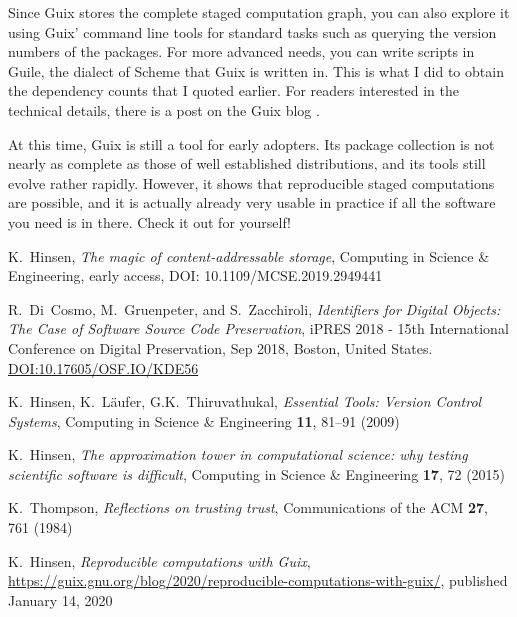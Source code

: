 \documentclass[10pt,journal,compsoc]{IEEEtran}
\begin{document}
Since Guix stores the complete staged computation graph, you can also explore it using Guix' command line tools for standard tasks such as querying the version numbers of the packages. For more advanced needs, you can write scripts in Guile, the dialect of Scheme that Guix is written in. This is what I did to obtain the dependency counts that I quoted earlier. For readers interested in the technical details, there is a post on the Guix blog \cite{guix-blog}.

At this time, Guix is still a tool for early adopters. Its package collection is not nearly as complete as those of well established distributions, and its tools still evolve rather rapidly. However, it shows that reproducible staged computations are possible, and it is actually already very usable in practice if all the software you need is in there. Check it out for yourself!


%
%
%

\begin{thebibliography}{1}

K.~Hinsen,
\textit{The magic of content-addressable storage},
Computing in Science \& Engineering, early access,
DOI: 10.1109/MCSE.2019.2949441

R.~Di~Cosmo, M.~Gruenpeter, and S.~Zacchiroli,
\textit{Identifiers for Digital Objects: The Case of Software Source Code Preservation},
iPRES 2018 - 15th International Conference on Digital Preservation, Sep 2018, Boston, United States.
\href{http://doi.org/10.17605/OSF.IO/KDE56}{DOI:10.17605/OSF.IO/KDE56}

K.~Hinsen, K.~L\"{a}ufer, G.K.~Thiruvathukal,
\textit{Essential Tools: Version Control Systems},
Computing in Science \& Engineering \textbf{11}, 81--91 (2009)

K.~Hinsen,
\textit{The approximation tower in computational science: why testing scientific software is difficult},
Computing in Science \& Engineering \textbf{17}, 72 (2015)

K.~Thompson,
\textit{Reflections on trusting trust},
Communications of the ACM \textbf{27}, 761 (1984)

K.~Hinsen,
\textit{Reproducible computations with Guix},
\href{https://guix.gnu.org/blog/2020/reproducible-computations-with-guix/}{https://guix.gnu.org/blog/2020/reproducible-computations-with-guix/},
published January 14, 2020

\end{thebibliography}
\end{document}
